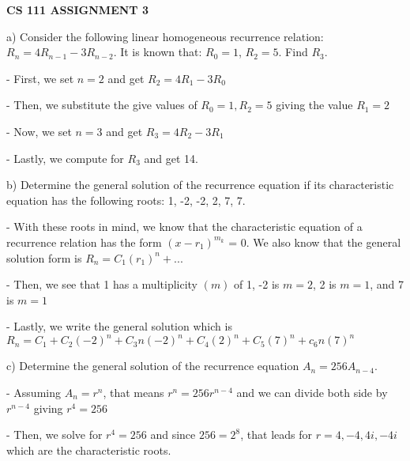 \documentclass{article}
\begin{document}
\centerline{\large \bf CS 111 ASSIGNMENT 3 }

\vskip 0.2in


\vskip 0.1in




\begin{problem}
\noindent a) Consider the following linear homogeneous recurrence relation: $R_n = 4R_{n-1} - 3R_{n-2}$. It is known that: $R_0 = 1$, $R_2 = 5$. Find $R_3$.

\vspace{0.1in} - First, we set $n=2$ and get $R_2 = 4R_1 - 3R_0$

\vspace{0.1in} - Then, we substitute the give values of $R_0 = 1, R_2 = 5$ giving the value $R_1 = 2$

\vspace{0.1in} - Now, we set $n=3$ and get $R_3=4R_2-3R_1$

\vspace{0.1in} - Lastly, we compute for $R_3$ and get 14.

\vspace {0.1in}
\noindent b) Determine the general solution of the recurrence  equation if its characteristic equation has the following roots:  1, -2, -2, 2, 7, 7.

\vspace{0.1in} - With these roots in mind, we know that the characteristic equation of a recurrence relation has the form $(x-r_1)^{m_k}$ = 0. We also know that the general solution form is $R_n=C_1(r_1)^n+...$

\vspace{0.1in} - Then, we see that 1 has a multiplicity $(m)$ of 1, -2 is $m=2$, 2 is $m=1$, and 7 is $m=1$

\vspace{0.1in} - Lastly, we write the general solution which is $R_n=C_1+C_2(-2)^n+C_3n(-2)^n+C_4(2)^n+C_5(7)^n+c_6n(7)^n$

\vspace {0.1in}
\noindent  c) Determine the general solution of the recurrence  equation $A_n = 256A_{n-4}$.

\vspace{0.1in} - Assuming $A_n=r^n$, that means $r^n=256r^{n-4}$ and we can divide both side by $r^{n-4}$ giving $r^4=256$

\vspace{0.1in} - Then, we solve for $r^4=256$ and since $256=2^8$, that leads for $r= 4,-4,4i,-4i$ which are the characteristic roots.


\end{problem}
\end{document}
